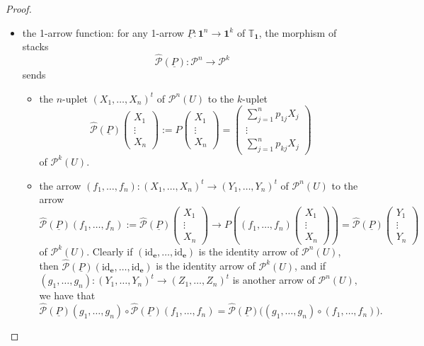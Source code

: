 \documentclass[11pt]{amsart}
\newcommand{\cP}{\mathcal{P}}
\newcommand{\id}{\mathrm{id}}
\newcommand{\bfu}{\textbf{1}}
\newcommand{\twoT}{\mathbb{T}}
\theoremstyle{definition}
\numberwithin{equation}{section}
\begin{document}
\begin{proof}
\begin{itemize}
 	\item the 1-arrow function: for any 1-arrow
 	$\underline{P}: \bfu^n \to \bfu^k$ of $\twoT_\bfu$, the morphism of stacks
 	$$\widehat{\cP}(\underline{P}): \cP^n \longrightarrow  \cP^k $$
 	sends 
 	\begin{itemize}
 		\item the $n$-uplet $(X_1, \dots, X_n)^t$ of $\cP^n(U)$ to the $k$-uplet 
 		$$\widehat{\cP}(\underline{P}) \left(\begin{matrix} X_1 \\ \vdots \\ X_n\end{matrix}\right) :=P \left(\begin{matrix} X_1 \\ \vdots \\ X_n\end{matrix}\right)
 		=  \left(\begin{matrix} \sum_{j=1}^np_{1j} X_j \\ \vdots \\ \sum_{j=1}^np_{kj} X_j\end{matrix}\right)$$
 		of  $\cP^k(U).$
 		\item the arrow $(f_1, \dots, f_n): (X_1, \dots, X_n)^t \to (Y_1, \dots, Y_n)^t$ of $\cP^n(U)$ to the arrow 
 		$$\widehat{\cP}(\underline{P}) (f_1, \dots, f_n):= \widehat{\cP}(\underline{P})  \left(\begin{matrix} X_1 \\ \vdots \\ X_n\end{matrix}\right) \longrightarrow P  \left((f_1, \dots, f_n) \left(\begin{matrix} X_1 \\ \vdots \\ X_n\end{matrix}\right) \right) = \widehat{\cP}(\underline{P}) \left(\begin{matrix} Y_1 \\ \vdots \\ Y_n\end{matrix}\right) $$
 		of  $\cP^k(U).$ Clearly if $(\id_\mathbf{e}, \dots, \id_\mathbf{e})$ is the identity arrow of $\cP^n(U)$, then  $\widehat{\cP}(\underline{P}) (\id_\mathbf{e}, \dots, \id_\mathbf{e})$ is the identity arrow of $\cP^k(U)$, and if
 		 $(g_1, \dots, g_n): (Y_1, \dots, Y_n)^t \to (Z_1, \dots, Z_n)^t$ is another arrow of $\cP^n(U),$ we have that 
 		 \[\widehat{\cP}(\underline{P}) (g_1, \dots, g_n) \circ \widehat{\cP}(\underline{P}) (f_1, \dots, f_n) = \widehat{\cP}(\underline{P}) \big ( (g_1, \dots, g_n) \circ (f_1, \dots, f_n) \big). \]

\end{itemize}
\end{itemize}
\end{proof}
\end{document}
